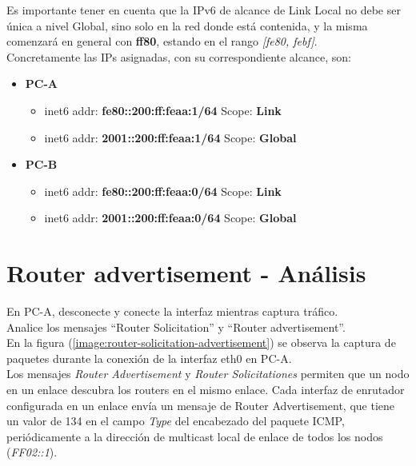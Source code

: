 \documentclass[osajnl,twocolumn,showpacs,superscriptaddress,10pt]{revtex4-1} %
\begin{document}
Es importante tener en cuenta que la IPv6 de alcance de Link Local no debe ser única a nivel Global,
sino solo en la red donde está contenida, y la misma comenzará en general con \textbf{ff80},
estando en el rango \textit{[fe80, febf]}. \\

Concretamente las IPs asignadas, con su correspondiente alcance, son:

\begin{itemize}
    \item \textbf{PC-A}
    
    \begin{itemize}
        \item inet6 addr: \textbf{fe80::200:ff:feaa:1/64} Scope: \textbf{Link}
        \item inet6 addr: \textbf{2001::200:ff:feaa:1/64} Scope: \textbf{Global}
    \end{itemize}

    \item \textbf{PC-B}
    
    \begin{itemize}
        \item inet6 addr: \textbf{fe80::200:ff:feaa:0/64} Scope: \textbf{Link}
        \item inet6 addr: \textbf{2001::200:ff:feaa:0/64} Scope: \textbf{Global}
    \end{itemize}
\end{itemize}

\section{Router advertisement - Análisis}

En PC-A, desconecte y conecte la interfaz mientras captura tráfico. \\

Analice los mensajes “Router Solicitation” y “Router advertisement”. \\

En la figura (\ref{image:router-solicitation-advertisement}) se observa la captura de paquetes durante 
la conexión de la interfaz eth0 en PC-A. \\

Los mensajes \textit{Router Advertisement} y \textit{Router Solicitationes} permiten que un nodo en un enlace descubra los routers 
en el mismo enlace. Cada interfaz de enrutador configurada en un enlace envía un mensaje de Router Advertisement, 
que tiene un valor de 134 en el campo \textit{Type} del encabezado del paquete ICMP, periódicamente a la dirección 
de multicast local de enlace de todos los nodos (\textit{FF02::1}). \\
\end{document}
